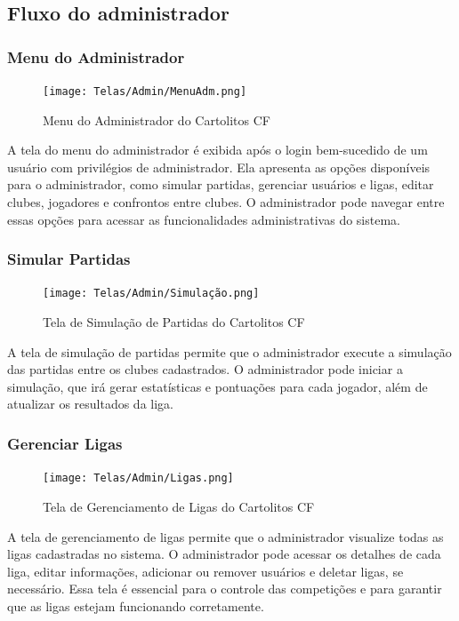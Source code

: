 \documentclass[12pt]{article}
\begin{document}
\subsection{Fluxo do administrador}
\label{sec:fluxo_admin}
\subsubsection{Menu do Administrador}
\label{sec:menu_admin}
\begin{figure}[H]
  \centering
  \texttt{[image: Telas/Admin/MenuAdm.png]}
  \caption{Menu do Administrador do Cartolitos CF}
  \label{fig:menu_admin}
\end{figure}
A tela do menu do administrador é exibida após o login bem-sucedido de um usuário com privilégios de administrador. Ela apresenta as opções disponíveis para o administrador, como simular partidas, gerenciar usuários e ligas, editar clubes, jogadores e confrontos entre clubes. O administrador pode navegar entre essas opções para acessar as funcionalidades administrativas do sistema.

\subsubsection{Simular Partidas}
\label{sec:simular_partidas}
\begin{figure}[H]
  \centering
  \texttt{[image: Telas/Admin/Simulação.png]}
  \caption{Tela de Simulação de Partidas do Cartolitos CF}
  \label{fig:simular_partidas}
\end{figure}
A tela de simulação de partidas permite que o administrador execute a simulação das partidas entre os clubes cadastrados. O administrador pode iniciar a simulação, que irá gerar estatísticas e pontuações para cada jogador, além de atualizar os resultados da liga.

\subsubsection{Gerenciar Ligas}
\label{sec:gerenciar_ligas}
\begin{figure}[H]
  \centering
  \texttt{[image: Telas/Admin/Ligas.png]}
  \caption{Tela de Gerenciamento de Ligas do Cartolitos CF}
  \label{fig:gerenciar_ligas}
\end{figure}
A tela de gerenciamento de ligas permite que o administrador visualize todas as ligas cadastradas no sistema. O administrador pode acessar os detalhes de cada liga, editar informações, adicionar ou remover usuários e deletar ligas, se necessário. Essa tela é essencial para o controle das competições e para garantir que as ligas estejam funcionando corretamente.
\end{document}
